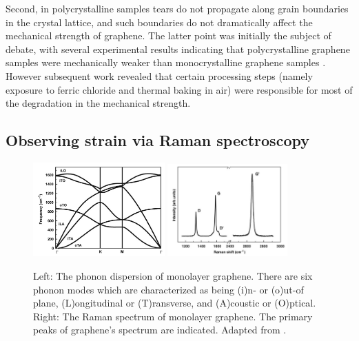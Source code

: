 \documentclass[edeposit,fullpage,draftthesis]{uiucthesis2009}
\begin{document}
        Second, in polycrystalline samples tears do not propagate along grain boundaries in the crystal lattice, and such
        boundaries do not dramatically affect the mechanical strength of graphene. The latter point
        was initially the subject of debate, with several experimental results indicating that polycrystalline
        graphene samples  were mechanically weaker than monocrystalline graphene samples \cite{huang2011grains,ruiz2011softened}.
        However subsequent work \cite{lee2013high, rasool2013measurement} revealed that certain processing steps 
        (namely exposure to 
        ferric chloride and thermal baking in air) were responsible for most of the degradation in the mechanical strength.
        
        
        \subsection{Observing strain via Raman spectroscopy}
        \label{sec:bg:raman}
        
            \begin{figure}
            \centering
            \includegraphics[width=0.45\textwidth]{images/background/graphene_phonons.png}
            \includegraphics[width=0.41\textwidth]{images/background/graphene_raman2.png}
            \caption[Phonon dispersion and Raman spectrum of monolayer graphene]{
            Left: The phonon dispersion of monolayer graphene. There are six phonon modes which
            are characterized as being (i)n- or (o)ut-of plane, (L)ongitudinal or (T)ransverse,
            and (A)coustic or (O)ptical.
            Right: The Raman spectrum of monolayer graphene. The primary peaks of graphene's spectrum are indicated.
            Adapted from \cite{malard2009raman}.
            }
            \label{fig:graphene_raman}
            \end{figure}
       
\end{document}
